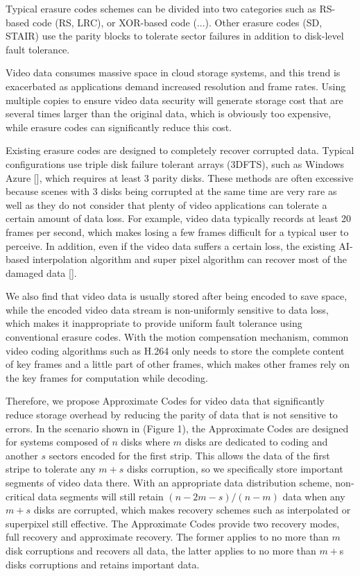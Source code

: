 \documentclass[conference]{IEEEtran}
\begin{document}
Typical erasure codes schemes can be divided into two categories such as RS-based code (RS, LRC), or XOR-based code (...). Other erasure codes (SD, STAIR) use the parity blocks to tolerate sector failures in addition to disk-level fault tolerance.

Video data consumes massive space in cloud storage systems, and this trend is exacerbated as applications demand increased resolution and frame rates. Using multiple copies to ensure video data security will generate storage cost that are several times larger than the original data, which is obviously too expensive, while erasure codes can significantly reduce this cost.

Existing erasure codes are designed to completely recover corrupted data. Typical configurations use triple disk failure tolerant arrays (3DFTS), such as Windows Azure [], which requires at least 3 parity disks. These methods are often excessive because scenes with 3 disks being corrupted at the same time are very rare as well as they do not consider that plenty of video applications can tolerate a certain amount of data loss. For example, video data typically records at least 20 frames per second, which makes losing a few frames difficult for a typical user to perceive. In addition, even if the video data suffers a certain loss, the existing AI-based interpolation algorithm and super pixel algorithm can recover most of the damaged data [].

We also find that video data is usually stored after being encoded to save space, while the encoded video data stream is non-uniformly sensitive to data loss, which makes it inappropriate to provide uniform fault tolerance using conventional erasure codes. With the motion compensation mechanism, common video coding algorithms such as H.264 only needs to store the complete content of key frames and a little part of other frames, which makes other frames rely on the key frames for computation while decoding.

Therefore, we propose Approximate Codes for video data that significantly reduce storage overhead by reducing the parity of data that is not sensitive to errors. In the scenario shown in (Figure 1), the Approximate Codes are designed for systems composed of $n$ disks where $m$ disks are dedicated to coding and another $s$ sectors encoded for the first strip. This allows the data of the first stripe to tolerate any $m+s$ disks corruption, so we specifically store important segments of video data there. With an appropriate data distribution scheme, non-critical data segments will still retain $(n-2m-s)/(n-m)$ data when any $m+s$ disks are corrupted, which makes 
recovery schemes such as interpolated or superpixel still effective. The Approximate Codes provide two recovery modes, full recovery and approximate recovery. The former applies to no more than $m$ disk corruptions and recovers all data, the latter applies to no more than $m+$s disks corruptions and retains important data.
\end{document}
